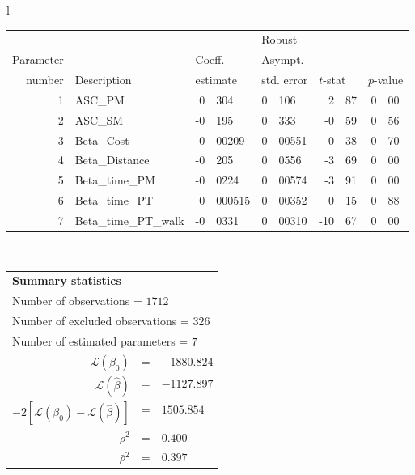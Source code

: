   \begin{tabular}{l}
\begin{tabular}{rlr@{.}lr@{.}lr@{.}lr@{.}l}
         &                       &   \multicolumn{2}{l}{}    & \multicolumn{2}{l}{Robust}  &     \multicolumn{4}{l}{}   \\
Parameter &                       &   \multicolumn{2}{l}{Coeff.}      & \multicolumn{2}{l}{Asympt.}  &     \multicolumn{4}{l}{}   \\
number &  Description                     &   \multicolumn{2}{l}{estimate}      & \multicolumn{2}{l}{std. error}  &   \multicolumn{2}{l}{$t$-stat}  &   \multicolumn{2}{l}{$p$-value}   \\

\hline

1 & ASC_PM  & 0&304 & 0&106 & 2&87 & 0&00\\
2 & ASC_SM & -0&195 & 0&333 & -0&59 & 0&56\\
3 & Beta_Cost & 0&00209 & 0&00551 & 0&38 & 0&70\\
4 & Beta_Distance & -0&205 & 0&0556 & -3&69 & 0&00\\
5 & Beta_time_PM & -0&0224 & 0&00574 & -3&91 & 0&00\\
6 & Beta_time_PT & 0&000515 & 0&00352 & 0&15 & 0&88\\
7 & Beta_time_PT_walk & -0&0331 & 0&00310 & -10&67 & 0&00\\
\hline
\end{tabular}
\\
\begin{tabular}{rcl}
\multicolumn{3}{l}{\bf Summary statistics}\\
\multicolumn{3}{l}{ Number of observations = $1712$} \\
\multicolumn{3}{l}{ Number of excluded observations = $326$} \\
\multicolumn{3}{l}{ Number of estimated  parameters = $7$} \\
 $\mathcal{L}(\beta_0)$ &=&  $-1880.824$ \\
 $\mathcal{L}(\hat{\beta})$ &=& $-1127.897 $  \\
 $-2[\mathcal{L}(\beta_0) -\mathcal{L}(\hat{\beta})]$ &=& $1505.854$ \\
    $\rho^2$ &=&   $0.400$ \\
    $\bar{\rho}^2$ &=&    $0.397$ \\
\end{tabular}
  \end{tabular}
